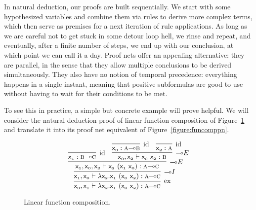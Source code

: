 In natural deduction, our proofs are built sequentially.
We start with some hypothesized variables and combine them via rules to derive more complex terms, which then serve as premises for a next iteration of rule applications.
As long as we are careful not to get stuck in some detour loop hell, we rinse and repeat, and eventually, after a finite number of steps, we end up with our conclusion, at which point we can call it a day.
Proof nets offer an appealing alternative: they are parallel, in the sense that they allow multiple conclusions to be derived simultaneously.
They also have no notion of temporal precedence: everything happens in a single instant, meaning that positive subformulas are good to use without having to wait for their conditions to be met.

To see this in practice, a simple but concrete example will prove helpful.
We will consider the natural deduction proof of linear function composition of Figure~\ref{figure:funcomp} and translate it into its proof net equivalent of Figure~\ref{figure:funcomppn}.

\begin{figure}
	\[
		\infer[\Exchange]{\term{\Var{0}}, \term{\Var{1}} \vdash \term{\lam \Var{2}.\Var{1}~(\Var{0}~\Var{2})}: \prop{a} \li \prop{c}}{
			\infer[\li I]{\term{\Var{1}}, \term{\Var{0}} \vdash \term{\lam \Var{2}.\Var{1}~(\Var{0}~\Var{2})}: \prop{a} \li \prop{c}}{
				\infer[\li E]{\term{\Var{1}}, \term{\Var{0}}, \term{\Var{2}} \vdash \term{\Var{2}~(\Var{1}~\Var{0})}: \prop{a} \li \prop{c}}{
					\infer[\Ax]{\term{\Var{1}}:\prop{b}\li\prop{c}}{}
					&
					\infer[\li E]{\term{\Var{0}}, \term{\Var{2}} \vdash \term{\Var{0}~\Var{2}}: \prop{b}}{
						\infer[\Ax]{\term{\Var{0}}: \prop{a}\li\prop{b}}{}
						&
						\infer[\Ax]{\term{\Var{2}}: \prop{a}}{}
					}
				}
			}
		}
	\]
	\caption{Linear function composition.}
	\label{figure:funcomp}
\end{figure}

